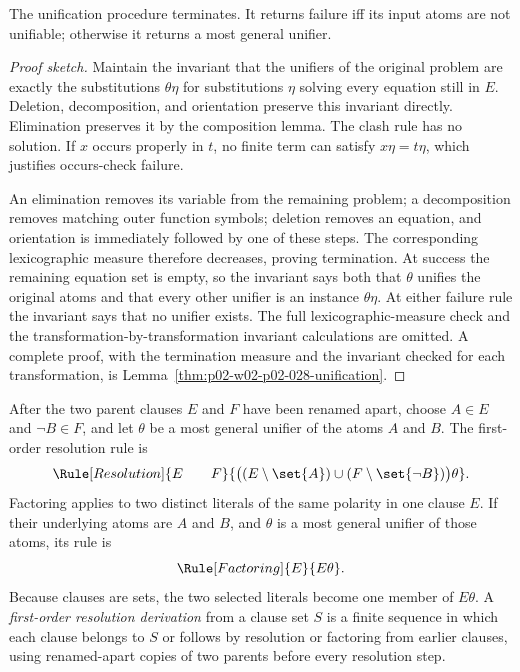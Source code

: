 \begin{theorem}
The unification procedure terminates.  It returns failure iff its
input atoms are not unifiable; otherwise it returns a most general unifier.
\end{theorem}
\begin{proof}[Proof sketch]
Maintain the invariant that the unifiers of the original problem are exactly
the substitutions \(\theta\eta\) for substitutions \(\eta\) solving every
equation still in \(E\).  Deletion, decomposition, and orientation preserve
this invariant directly.  Elimination preserves it by the composition lemma.
The clash rule has no solution.  If \(x\) occurs properly in \(t\), no finite
term can satisfy \(x\eta=t\eta\), which justifies occurs-check failure.

An elimination removes its variable from the remaining problem; a
decomposition removes matching outer function symbols; deletion removes an
equation, and orientation is immediately followed by one of these steps.
The corresponding lexicographic measure therefore decreases, proving
termination.  At success the remaining equation set is empty, so the
invariant says both that \(\theta\) unifies the original atoms and that every
other unifier is an instance \(\theta\eta\).  At either failure rule the
invariant says that no unifier exists.  The full lexicographic-measure check
and the transformation-by-transformation invariant calculations are omitted.
A complete proof, with the termination measure and the invariant checked for each transformation, is Lemma~\ref{thm:p02-w02-p02-028-unification}.
\end{proof}

After the two parent clauses \(E\) and \(F\) have been renamed apart, choose
\(A\in E\) and \(\neg B\in F\), and let \(\theta\) be a most general
unifier of the atoms \(A\) and \(B\).  The first-order resolution rule is
\[
 \Rule[Resolution]{E\qquad F}
 {\bigl((E\setminus\set{A})\cup(F\setminus\set{\neg B})\bigr)\theta}.
\]
Factoring applies to two distinct literals of the same polarity in one
clause \(E\).  If their underlying atoms are \(A\) and \(B\), and
\(\theta\) is a most general unifier of those atoms, its rule is
\[
 \Rule[Factoring]{E}{E\theta}.
\]
Because clauses are sets, the two selected literals become one member of
\(E\theta\).  A \emph{first-order resolution derivation} from a clause set
\(S\) is a finite sequence in which each clause belongs to \(S\) or follows
by resolution or factoring from earlier clauses, using renamed-apart copies
of two parents before every resolution step.

